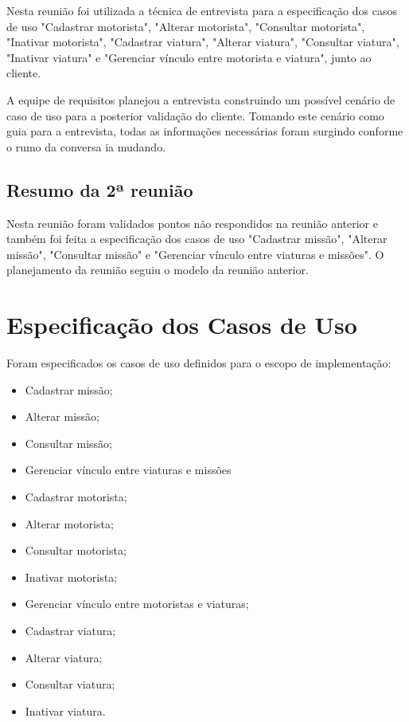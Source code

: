       Nesta reunião foi utilizada a técnica de entrevista para a especificação dos casos de uso "Cadastrar motorista", 
      "Alterar motorista", "Consultar motorista", "Inativar motorista", "Cadastrar viatura", "Alterar viatura",
      "Consultar viatura", "Inativar viatura" e "Gerenciar vínculo entre motorista e viatura", junto ao cliente.
      
      A equipe de requisitos planejou a entrevista construindo um possível cenário de caso de uso para a posterior
      validação do cliente. Tomando este cenário como guia para a entrevista, todas as informações necessárias foram surgindo
      conforme o rumo da conversa ia mudando.
            
    \subsection{Resumo da 2ª reunião}
      
      Nesta reunião foram validados pontos não respondidos na reunião anterior e também foi feita a especificação dos casos de uso
      "Cadastrar missão", "Alterar missão", "Consultar missão" e "Gerenciar vínculo entre viaturas e missões".
      O planejamento da reunião seguiu o modelo da reunião anterior.
      
  
  \section{Especificação dos Casos de Uso}
 
    Foram especificados os casos de uso definidos para o escopo de implementação:
    
    \begin{itemize}
      \item Cadastrar missão;
      \item Alterar missão;
      \item Consultar missão;
      \item Gerenciar vínculo entre viaturas e missões
      \item Cadastrar motorista;
      \item Alterar motorista;
      \item Consultar motorista;
      \item Inativar motorista;
      \item Gerenciar vínculo entre motoristas e viaturas;
      \item Cadastrar viatura;
      \item Alterar viatura;
      \item Consultar viatura;
      \item Inativar viatura.
    \end{itemize}

